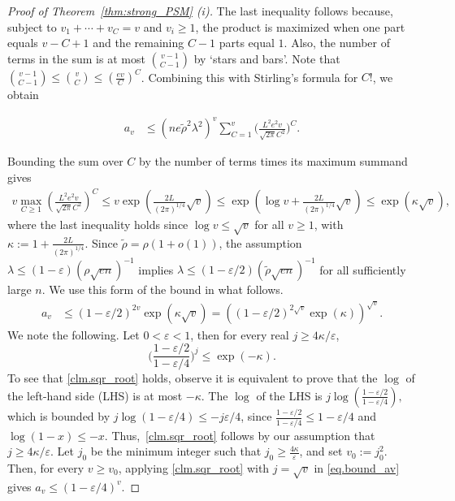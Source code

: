 \documentclass[11pt, letterpaper]{article}
\numberwithin{equation}{section}
\begin{document}
\begin{proof}[Proof of Theorem~\ref{thm:strong_PSM} \textnormal{(i)}]
 The last inequality follows because, subject to $v_1+\cdots+v_C=v$ and
$v_i\ge 1$, the product is maximized when one part equals $v-C+1$ and the
remaining $C-1$ parts equal $1$. Also, the number of terms in the sum is at most $\binom{v-1}{C-1}$ by `stars and bars'. 
Note that $\binom{v-1}{C-1}\leq \binom{v}{C}\leq (\frac{ev}{C})^C$. Combining this with Stirling's formula for $C!$, we obtain

   \begin{align*}
   a_v 
    &\leq  (ne\tilde{\rho}^2 \lambda^2)^v \sum_{C=1}^v \Big(\frac{L^2e^2v}{\sqrt{2\pi} C^2}\Big)^C.
    \end{align*}
    
\noindent Bounding the sum over $C$ by the number of terms times its maximum summand gives
\begin{align*}
v\max_{C\ge 1}\left(\frac{L^2 e^2 v}{\sqrt{2\pi} C^2}\right)^C
 \le
v \exp \left(\frac{2L}{(2\pi)^{1/4}}\sqrt v\right)
\le \exp\left(\log v+\frac{2L}{(2\pi)^{1/4}}\sqrt v\right)\le \exp(\kappa\sqrt v),
\end{align*}
where the last inequality holds since $\log v \le \sqrt v$ for all $v\ge 1$,
with $\kappa:=1+\frac{2L}{(2\pi)^{1/4}}$. 
Since $\tilde\rho=\rho(1+o(1))$, the assumption
$\lambda\le (1-\varepsilon)(\rho\sqrt{en})^{-1}$ implies $\lambda\le (1-\varepsilon/2)(\tilde\rho\sqrt{en})^{-1}
$ for all sufficiently large $n$. We use this form of the bound in what follows.
    \begin{align}
a_v
&\le  (1-\varepsilon/2)^{2v} \exp\left({\kappa\sqrt{v}}\right) 
=  \left((1-\varepsilon/2)^{2\sqrt{v}} \exp({\kappa})\right)^{\sqrt{v}}.
\label{eq.bound_av}
\end{align}
\noindent We note the following. Let $0<\varepsilon <1$, then for every real $j\geq 4\kappa/\varepsilon$, 
 \begin{equation}\label{clm.sqr_root}\bigg(\frac{1-\varepsilon/2}{1-\varepsilon/4}\bigg)^{j}\leq \exp\left({-\kappa}\right).
 \end{equation}
%
To see that \eqref{clm.sqr_root} holds, observe it is equivalent to prove that the $\log$ of the left-hand side (LHS) is at most $-\kappa$. The $\log$ of the LHS is
$j\log\left(\frac{1-\varepsilon/2}{1-\varepsilon/4}\right),$
which is bounded by $j\log(1-\varepsilon/4)\le -j\varepsilon/4$, since $\frac{1-\varepsilon/2}{1-\varepsilon/4}\le 1-\varepsilon/4$ and $\log(1-x)\le -x$. Thus,~\eqref{clm.sqr_root} follows by our assumption that $j\ge 4\kappa/\varepsilon$. Let $j_0$ be the minimum integer such that $j_0 \ge \frac{4\kappa}{\varepsilon}$, and set $v_0:=j_0^2$. Then, for every $v \ge v_0$, applying \eqref{clm.sqr_root} with $j=\sqrt{v}$ in \eqref{eq.bound_av} gives $a_v\le (1-\varepsilon/4)^{v}$. 

\end{proof}
\end{document}
